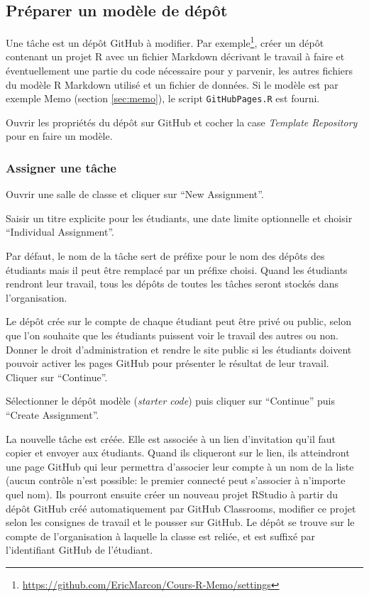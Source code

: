\documentclass[
  12pt,
  french,
  a4paper,
  extrafontsizes,onecolumn,openright
  ]{memoir}
\begin{document}
\hypertarget{pruxe9parer-un-moduxe8le-de-duxe9puxf4t}{%
\subsection{Préparer un modèle de dépôt}\label{pruxe9parer-un-moduxe8le-de-duxe9puxf4t}}

Une tâche est un dépôt GitHub à modifier.
Par exemple\footnote{\url{https://github.com/EricMarcon/Cours-R-Memo/settings}}, créer un dépôt contenant un projet R avec un fichier Markdown décrivant le travail à faire et éventuellement une partie du code nécessaire pour y parvenir, les autres fichiers du modèle R Markdown utilisé et un fichier de données.
Si le modèle est par exemple Memo (section \ref{sec:memo}), le script \texttt{GitHubPages.R} est fourni.

Ouvrir les propriétés du dépôt sur GitHub et cocher la case \emph{Template Repository} pour en faire un modèle.

\hypertarget{assigner-une-tuxe2che}{%
\subsubsection{Assigner une tâche}\label{assigner-une-tuxe2che}}

Ouvrir une salle de classe et cliquer sur \enquote{New Assignment}.

Saisir un titre explicite pour les étudiants, une date limite optionnelle et choisir \enquote{Individual Assignment}.

Par défaut, le nom de la tâche sert de préfixe pour le nom des dépôts des étudiants mais il peut être remplacé par un préfixe choisi.
Quand les étudiants rendront leur travail, tous les dépôts de toutes les tâches seront stockés dans l'organisation.

Le dépôt crée sur le compte de chaque étudiant peut être privé ou public, selon que l'on souhaite que les étudiants puissent voir le travail des autres ou non.
Donner le droit d'administration et rendre le site public si les étudiants doivent pouvoir activer les pages GitHub pour présenter le résultat de leur travail.
Cliquer sur \enquote{Continue}.

Sélectionner le dépôt modèle (\emph{starter code}) puis cliquer sur \enquote{Continue} puis \enquote{Create Assignment}.

La nouvelle tâche est créée.
Elle est associée à un lien d'invitation qu'il faut copier et envoyer aux étudiants.
Quand ils cliqueront sur le lien, ils atteindront une page GitHub qui leur permettra d'associer leur compte à un nom de la liste (aucun contrôle n'est possible: le premier connecté peut s'associer à n'importe quel nom).
Ils pourront ensuite créer un nouveau projet RStudio à partir du dépôt GitHub créé automatiquement par GitHub Classrooms, modifier ce projet selon les consignes de travail et le pousser sur GitHub.
Le dépôt se trouve sur le compte de l'organisation à laquelle la classe est reliée, et est suffixé par l'identifiant GitHub de l'étudiant.
\end{document}
